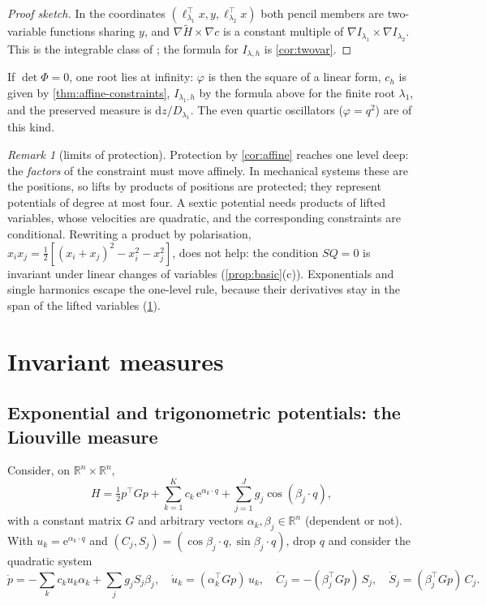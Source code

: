 \documentclass[11pt,a4paper]{article}
\theoremstyle{definition}
\theoremstyle{remark}
\newtheorem{remark}[theorem]{Remark}
\newcommand{\R}{\mathbb{R}}
\newcommand{\dd}{\mathrm{d}}
\newcommand{\tr}{^{\!\top}}
\begin{document}
\begin{proof}[Proof sketch]
In the coordinates $(\ell_{\lambda_1}\tr x,y,\ell_{\lambda_2}\tr x)$ both pencil members are two-variable
functions sharing $y$, and $\nabla\tilde H\times\nabla c$ is a constant multiple of
$\nabla I_{\lambda_1}\times\nabla I_{\lambda_2}$. This is the integrable class of \cite[Theorem~2]{CMOQ19};
the formula for $I_{\lambda,h}$ is \cref{cor:twovar}.
\end{proof}

If $\det\Phi=0$, one root lies at infinity: $\varphi$ is then the square of a linear form, $c_h$ is given by
\cref{thm:affine-constraints}, $I_{\lambda_1,h}$ by the formula above for the finite root $\lambda_1$, and the
preserved measure is $\dd z/D_{\lambda_1}$. The even quartic oscillators ($\varphi=q^2$) are of this kind.

\begin{remark}[limits of protection]\label{rem:limits}
Protection by \cref{cor:affine} reaches one level deep: the \emph{factors} of the constraint must move
affinely. In mechanical systems these are the positions, so lifts by products of positions are protected;
they represent potentials of degree at most four. A sextic potential needs products of lifted variables,
whose velocities are quadratic, and the corresponding constraints are conditional. Rewriting a product by
polarisation, $x_ix_j=\frac12[(x_i+x_j)^2-x_i^2-x_j^2]$, does not help: the condition $SQ=0$ is invariant
under linear changes of variables (\cref{prop:basic}(c)). Exponentials and single harmonics escape the
one-level rule, because their derivatives stay in the span of the lifted variables (\cref{sec:measures}).
\end{remark}

\section{Invariant measures}\label{sec:measures}

\subsection{Exponential and trigonometric potentials: the Liouville measure}

Consider, on $\R^n\times\R^n$,
\begin{equation}\label{eq:exptrig}
H=\tfrac12p\tr Gp+\sum_{k=1}^Kc_k\,\mathrm e^{\alpha_k\cdot q}+\sum_{j=1}^Jg_j\cos(\beta_j\cdot q),
\end{equation}
with a constant matrix $G$ and arbitrary vectors $\alpha_k,\beta_j\in\R^n$ (dependent or not). With
$u_k=\mathrm e^{\alpha_k\cdot q}$ and $(C_j,S_j)=(\cos\beta_j\cdot q,\sin\beta_j\cdot q)$, drop $q$ and consider
the quadratic system
\begin{equation}\label{eq:exptriglift}
\dot p=-\sum_kc_ku_k\alpha_k+\sum_jg_jS_j\beta_j,\quad
\dot u_k=(\alpha_k\tr Gp)\,u_k,\quad
\dot C_j=-(\beta_j\tr Gp)\,S_j,\quad \dot S_j=(\beta_j\tr Gp)\,C_j .
\end{equation}
\end{document}
